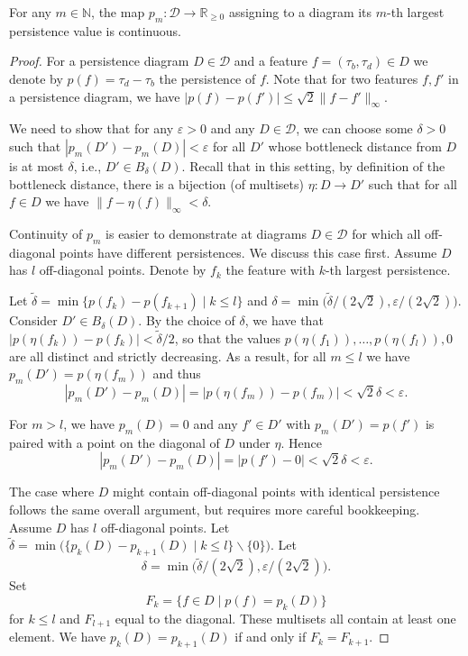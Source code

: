 \documentclass[10pt,a4paper]{amsart}
\begin{document}
\begin{lemma}\label{lem:pm}
    For any $m \in \mathbb{N}$, the map $p_m:\mathcal{D} \to \mathbb{R}_{\geq 0}$ assigning to a diagram its $m$-th largest persistence value is continuous.
\end{lemma}

\begin{proof}
    For a persistence diagram $D \in \mathcal D$ and a feature $f=(\tau_b, \tau_d) \in D$ we denote by $p(f)=\tau_d - \tau_b$ the persistence of $f$. Note that for two features $f,f'$ in a persistence diagram, we have $|p(f)- p(f')| \leq \sqrt{2}\|f -f'\|_\infty$.
    
    We need to show that for any $\varepsilon > 0$ and any $D \in \mathcal{D}$, we can choose some $\delta>0$ such that $|p_m(D') -p_m(D)| < \varepsilon$ for all $D'$ whose bottleneck distance from $D$ is at most $\delta$, i.e., $D'\in B_{\delta}(D)$. Recall that in this setting, by definition of the bottleneck distance, there is a bijection (of multisets) $\eta: D \to D'$ such that for all $f\in D$ we have $\|f-\eta(f)\|_{\infty} < \delta$. 

    Continuity of $p_m$ is easier to demonstrate at diagrams $D\in \mathcal{D}$ for which all off-diagonal points have different persistences. We discuss this case first. Assume $D$ has $l$ off-diagonal points. Denote by $f_k$ the feature with $k$-th largest persistence. 

    Let $\tilde{\delta} = \min\{p(f_k)-p(f_{k+1}) \mid k\leq l\}$ and $\delta = \min\big(\tilde{\delta} / (2\sqrt{2}), \varepsilon/(2\sqrt{2})\big)$. Consider $D'\in B_{\delta}(D)$.  By the choice of $\delta$, we have that $|p(\eta(f_k)) - p(f_k)| < \tilde{\delta}/2$, so that the values $p(\eta(f_1)),\dots, p(\eta(f_l)), 0$ are all distinct and strictly decreasing. As a result, for all $m\leq l$ we have $p_m(D') = p(\eta(f_m))$ and thus
    $$|p_m(D') - p_m(D)| = |p(\eta(f_m)) - p(f_m)| < \sqrt{2} \delta < \varepsilon.$$

    For $m>l$, we have $p_m(D)=0$ and any $f'\in D'$ with $p_m(D')=p(f')$ is paired with a point on the diagonal of $D$ under $\eta$. Hence
    $$|p_m(D') - p_m(D)| = |p(f') - 0|  < \sqrt{2} \delta < \varepsilon.$$

    The case where $D$ might contain off-diagonal points with identical persistence follows the same overall argument, but requires more careful bookkeeping. Assume $D$ has $l$ off-diagonal points. Let $\tilde{\delta} = \min \big(\{p_k(D) - p_{k+1}(D) \mid k\leq l\}\backslash \{0\}\big)$. Let $$\delta = \min\big(\tilde{\delta}/(2\sqrt{2}), \varepsilon /(2\sqrt{2})\big).$$
    Set $$F_k = \{f\in D \mid p(f)= p_k(D)\}$$ for $k \leq l$ and $F_{l+1}$ equal to the diagonal. These multisets all contain at least one element. We have $p_k(D) = p_{k+1}(D)$ if and only if $F_k = F_{k+1}$.


\end{proof}
\end{document}
